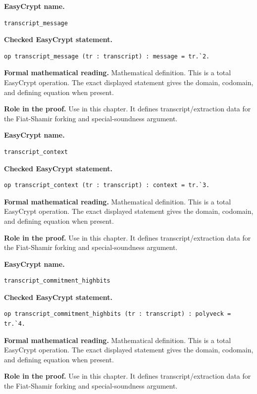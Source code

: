 \begin{formaldefinition}
\noindent\textbf{EasyCrypt name.}
\begin{lstlisting}[language=EasyCrypt,basicstyle=\ttfamily\scriptsize]
transcript_message
\end{lstlisting}
\noindent\textbf{Checked EasyCrypt statement.}
\begin{lstlisting}[language=EasyCrypt,basicstyle=\ttfamily\scriptsize]
op transcript_message (tr : transcript) : message = tr.`2.
\end{lstlisting}
\noindent\textbf{Formal mathematical reading.}
Mathematical definition. This is a total EasyCrypt operation.  The exact displayed statement gives the domain, codomain, and defining equation when present.

\noindent\textbf{Role in the proof.}
Use in this chapter. It defines transcript/extraction data for the Fiat-Shamir forking and special-soundness argument.

\end{formaldefinition}

\begin{formaldefinition}
\noindent\textbf{EasyCrypt name.}
\begin{lstlisting}[language=EasyCrypt,basicstyle=\ttfamily\scriptsize]
transcript_context
\end{lstlisting}
\noindent\textbf{Checked EasyCrypt statement.}
\begin{lstlisting}[language=EasyCrypt,basicstyle=\ttfamily\scriptsize]
op transcript_context (tr : transcript) : context = tr.`3.
\end{lstlisting}
\noindent\textbf{Formal mathematical reading.}
Mathematical definition. This is a total EasyCrypt operation.  The exact displayed statement gives the domain, codomain, and defining equation when present.

\noindent\textbf{Role in the proof.}
Use in this chapter. It defines transcript/extraction data for the Fiat-Shamir forking and special-soundness argument.

\end{formaldefinition}

\begin{formaldefinition}
\noindent\textbf{EasyCrypt name.}
\begin{lstlisting}[language=EasyCrypt,basicstyle=\ttfamily\scriptsize]
transcript_commitment_highbits
\end{lstlisting}
\noindent\textbf{Checked EasyCrypt statement.}
\begin{lstlisting}[language=EasyCrypt,basicstyle=\ttfamily\scriptsize]
op transcript_commitment_highbits (tr : transcript) : polyveck = tr.`4.
\end{lstlisting}
\noindent\textbf{Formal mathematical reading.}
Mathematical definition. This is a total EasyCrypt operation.  The exact displayed statement gives the domain, codomain, and defining equation when present.

\noindent\textbf{Role in the proof.}
Use in this chapter. It defines transcript/extraction data for the Fiat-Shamir forking and special-soundness argument.

\end{formaldefinition}

